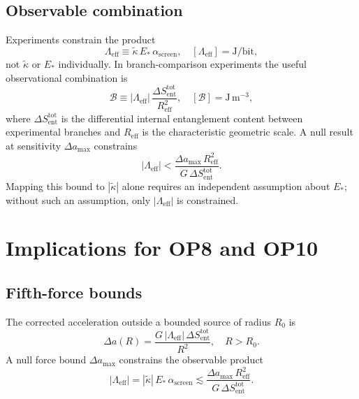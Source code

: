 \documentclass[11pt]{article}
\theoremstyle{plain}
\theoremstyle{definition}
\theoremstyle{remark}
\begin{document}
\subsection{Observable combination}

Experiments constrain the product
\begin{equation}
\Lambda_{\mathrm{eff}} \equiv \tilde{\kappa}\,E_*\,\alpha_{\mathrm{screen}},
\quad [\Lambda_{\mathrm{eff}}] = \mathrm{J/bit},
\end{equation}
not $\tilde{\kappa}$ or $E_*$ individually. In branch-comparison experiments the
useful observational combination is
\begin{equation}
\mathcal{B}
\equiv |\Lambda_{\mathrm{eff}}|\,\frac{\Delta S_{\mathrm{ent}}^{\mathrm{tot}}}{R_{\mathrm{eff}}^2},
\quad [\mathcal{B}] = \mathrm{J\,m^{-3}},
\end{equation}
where $\Delta S_{\mathrm{ent}}^{\mathrm{tot}}$ is the differential internal entanglement content between
experimental branches and $R_{\mathrm{eff}}$ is the characteristic geometric scale. A null result
at sensitivity $\Delta a_{\max}$ constrains
\begin{equation}
|\Lambda_{\mathrm{eff}}| < \frac{\Delta a_{\max}\,R_{\mathrm{eff}}^2}{G\,\Delta S_{\mathrm{ent}}^{\mathrm{tot}}}.
\end{equation}
Mapping this bound to $|\tilde{\kappa}|$ alone requires an independent assumption about
$E_*$; without such an assumption, only $|\Lambda_{\mathrm{eff}}|$ is constrained.

\section{Implications for OP8 and OP10}

\subsection{Fifth-force bounds}

The corrected acceleration outside a bounded source of radius $R_0$ is
\begin{equation}
\Delta a(R) = \frac{G\,|\Lambda_{\mathrm{eff}}|\,\Delta S_{\mathrm{ent}}^{\mathrm{tot}}}{R^2},
\quad R > R_0.
\end{equation}
A null force bound $\Delta a_{\max}$ constrains the observable product
\begin{equation}
|\Lambda_{\mathrm{eff}}|
= |\tilde{\kappa}|\,E_*\,\alpha_{\mathrm{screen}}
\lesssim \frac{\Delta a_{\max}\,R_{\mathrm{eff}}^2}{G\,\Delta S_{\mathrm{ent}}^{\mathrm{tot}}}.
\label{eq:Lambda-bound}
\end{equation}
\end{document}
